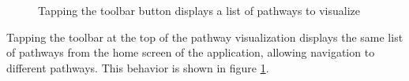 \begin{figure}[hbtp]
    \caption{\label{fig:maw_screenshot_pathway_list_popover} Tapping the
    toolbar button displays a list of pathways to visualize}
\end{figure}

Tapping the toolbar at the top of the pathway visualization displays the same
list of pathways from the home screen of the application, allowing navigation to
different pathways. This behavior is shown in figure
\ref{fig:maw_screenshot_pathway_list_popover}.
